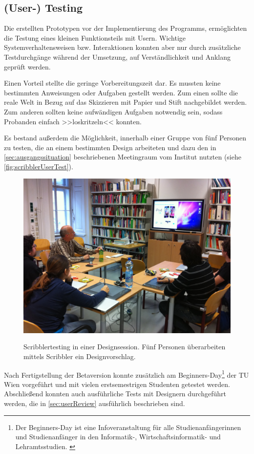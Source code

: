 \subsection{(User-) Testing}
Die erstellten Prototypen vor der Implementierung des Programms, ermöglichten die Testung eines kleinen Funktionsteils mit Usern. Wichtige Systemverhaltensweisen bzw. Interaktionen konnten aber nur durch zusätzliche Testdurchgänge während der Umsetzung, auf Verständlichkeit und Anklang geprüft werden.

\medskip Einen Vorteil stellte die geringe Vorbereitungszeit dar. Es mussten keine bestimmten Anweisungen oder Aufgaben gestellt werden. Zum einen sollte die reale Welt in Bezug auf das Skizzieren mit Papier und Stift nachgebildet werden. Zum anderen sollten keine aufwändigen Aufgaben notwendig sein, sodass Probanden einfach >>loskritzeln<< konnten.

\medskip Es bestand außerdem die Möglichkeit, \scribbler innerhalb einer Gruppe von fünf Personen zu testen, die an einem bestimmten Design arbeiteten und dazu den in \autoref{sec:ausgangssituation} beschriebenen Meetingraum vom Institut nutzten (siehe \autoref{fig:scribblerUserTest}).

\begin{figure}
	        {\includegraphics[width=1\linewidth]{gfx/scribblerUserTest}}
		\caption[Scribblertesting in einer Designsession]{Scribblertesting in einer Designsession. Fünf Personen überarbeiten mittels Scribbler ein Designvorschlag.}\label{fig:scribblerUserTest}
\end{figure}

\medskip Nach Fertigstellung der Betaversion konnte \scribbler zusätzlich am Beginners-Day\footnote{Der Beginners-Day ist eine Infoveranstaltung für alle Studienanfängerinnen und Studienanfänger in den Informatik-, Wirtschaftsinformatik- und Lehramtsstudien. \citep{TU:2010}} der TU Wien vorgeführt und mit vielen erstsemestrigen Studenten getestet werden. Abschließend konnten auch ausführliche Tests mit Designern durchgeführt werden, die in \autoref{sec:userReview} ausführlich beschrieben sind.
\newpage
